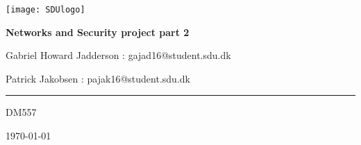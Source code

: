 \begin{titlepage}
	\centering
	\texttt{[image: SDUlogo]}\par\vspace{0.5cm} %
	{\huge\bfseries Networks and Security project part 2\par}
	\vspace{0.5cm}
	{\small Gabriel Howard Jadderson : gajad16@student.sdu.dk\par}
	{\small Patrick Jakobsen : pajak16@student.sdu.dk\par}
  {\rule{10.0cm}{0.1mm}\par}
	{\small DM557\par}
	{\small \today\par}
	\vspace{1cm}
\end{titlepage}

